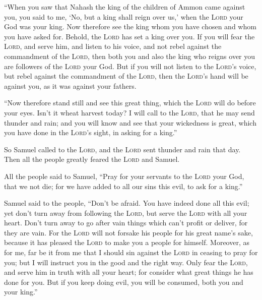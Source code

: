  ``When you saw that Nahash the king of the children of
Ammon came against you, you said to me, `No, but a king shall reign over
us,' when the \textsc{Lord} your God was your king.  Now
therefore see the king whom you have chosen and whom you have asked for.
Behold, the \textsc{Lord} has set a king over you.  If
you will fear the \textsc{Lord}, and serve him, and listen to his voice,
and not rebel against the commandment of the \textsc{Lord}, then both
you and also the king who reigns over you are followers of the
\textsc{Lord} your God.  But if you will not listen to
the \textsc{Lord}'s voice, but rebel against the commandment of the
\textsc{Lord}, then the \textsc{Lord}'s hand will be against you, as it
was against your fathers.

 ``Now therefore stand still and see this great thing,
which the \textsc{Lord} will do before your eyes.  Isn't
it wheat harvest today? I will call to the \textsc{Lord}, that he may
send thunder and rain; and you will know and see that your wickedness is
great, which you have done in the \textsc{Lord}'s sight, in asking for a
king.''

 So Samuel called to the \textsc{Lord}, and the
\textsc{Lord} sent thunder and rain that day. Then all the people
greatly feared the \textsc{Lord} and Samuel.

 All the people said to Samuel, ``Pray for your servants
to the \textsc{Lord} your God, that we not die; for we have added to all
our sins this evil, to ask for a king.''

 Samuel said to the people, ``Don't be afraid. You have
indeed done all this evil; yet don't turn away from following the
\textsc{Lord}, but serve the \textsc{Lord} with all your heart.
 Don't turn away to go after vain things which can't
profit or deliver, for they are vain.  For the
\textsc{Lord} will not forsake his people for his great name's sake,
because it has pleased the \textsc{Lord} to make you a people for
himself.  Moreover, as for me, far be it from me that I
should sin against the \textsc{Lord} in ceasing to pray for you; but I
will instruct you in the good and the right way.  Only
fear the \textsc{Lord}, and serve him in truth with all your heart; for
consider what great things he has done for you.  But if
you keep doing evil, you will be consumed, both you and your king.''

